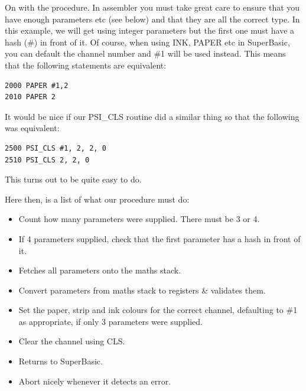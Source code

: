 On with the procedure. In assembler you must take great care to
    ensure that you have enough parameters etc (see below) and that they are
    all the correct type. In this example, we will get using integer
    parameters but the first one must have a hash (\#) in front of it. Of
    course, when using INK, PAPER etc in SuperBasic, you can default the
    channel number and \#1 will be used instead. This means that the following
    statements are equivalent:

\begin{lstlisting}[firstnumber=1,]
2000 PAPER #1,2
2010 PAPER 2
\end{lstlisting}

It would be nice if our PSI\_CLS routine did a similar thing so that
    the following was equivalent:

\begin{lstlisting}[firstnumber=1,]
2500 PSI_CLS #1, 2, 2, 0
2510 PSI_CLS 2, 2, 0
\end{lstlisting}

This turns out to be quite easy to do.

Here then, is a list of what our procedure must do:
\begin{itemize}[itemsep=0pt]

\item{}Count how many parameters were supplied. There must be 3 or
        4.


\item{}If 4 parameters supplied, check that the first parameter has a
        hash in front of it.


\item{}Fetches all parameters onto the maths stack.


\item{}Convert parameters from maths stack to registers \& validates
        them.


\item{}Set the paper, strip and ink colours for the correct channel,
        defaulting to \#1 as appropriate, if only 3 parameters were
        supplied.


\item{}Clear the channel using CLS.


\item{}Returns to SuperBasic.


\item{}Abort nicely whenever it detects an error.

\end{itemize}

